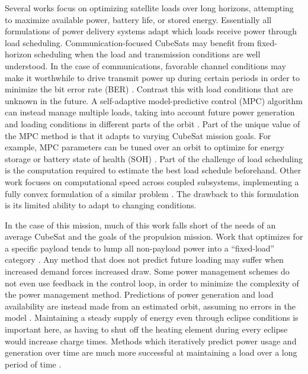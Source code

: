 Several works focus on optimizing satellite loads over long horizons, attempting to maximize available power, battery life, or stored energy. Essentially all formulations of power delivery systems adapt which loads receive power through load scheduling. Communication-focused CubeSats may benefit from fixed-horizon scheduling when the load and transmission conditions are well understood. In the case of communications, favorable channel conditions may make it worthwhile to drive transmit power up during certain periods in order to minimize the bit error rate (BER) \cite{husseinOptimizedLoadSchedulingAlgorithm2023}. Contrast this with load conditions that are unknown in the future. A self-adaptive model-predictive control (MPC) algorithm can instead manage multiple loads, taking into account future power generation and loading conditions in different parts of the orbit \cite{akarneSelfAdaptiveEnergyAwarePower2026}. Part of the unique value of the MPC method is that it adapts to varying CubeSat mission goals. For example, MPC parameters can be tuned over an orbit to optimize for energy storage or battery state of health (SOH) \cite{akarneSelfAdaptiveEnergyAwarePower2026}. Part of the challenge of load scheduling is the computation required to estimate the best load schedule beforehand. Other work focuses on computational speed across coupled subsystems, implementing a fully convex formulation of a similar problem \cite{doff-sottaSpacecraftEnergyManagement2022}. The drawback to this formulation is its limited ability to adapt to changing conditions.

In the case of this mission, much of this work falls short of the needs of an average CubeSat and the goals of the propulsion mission. Work that optimizes for a specific payload tends to lump all non-payload power into a ``fixed-load'' category \cite{husseinOptimizedLoadSchedulingAlgorithm2023}. Any method that does not predict future loading may suffer when increased demand forces increased draw. Some power management schemes do not even use feedback in the control loop, in order to minimize the complexity of the power management method. Predictions of power generation and load availability are instead made from an estimated orbit, assuming no errors in the model \cite{doff-sottaSpacecraftEnergyManagement2022}. Maintaining a steady supply of energy even through eclipse conditions is important here, as having to shut off the heating element during every eclipse would increase charge times. Methods which iteratively predict power usage and generation over time are much more successful at maintaining a load over a long period of time \cite{akarneSelfAdaptiveEnergyAwarePower2026}.

